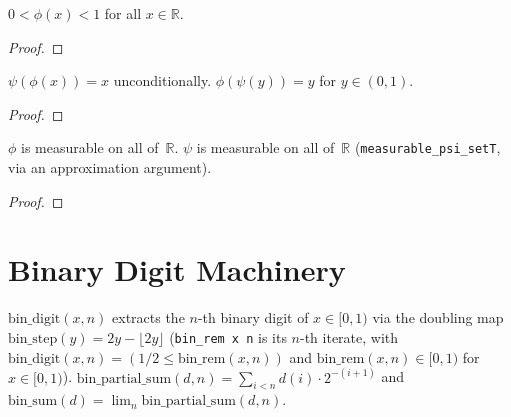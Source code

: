 \begin{lemma}\label{lem:phi_range}
  \rocqok
  $0 < \phi(x) < 1$ for all $x \in \mathbb{R}$.
\end{lemma}
\begin{proof}\rocqok\end{proof}

\begin{lemma}\label{lem:phi_psi_cancel}
  \rocqok
  $\psi(\phi(x)) = x$ unconditionally.
  $\phi(\psi(y)) = y$ for $y \in (0,1)$.
\end{lemma}
\begin{proof}\rocqok\end{proof}

\begin{lemma}\label{lem:phi_psi_measurable}
  \rocqok
  $\phi$ is measurable on all of~$\mathbb{R}$. $\psi$ is measurable on
  all of~$\mathbb{R}$ (\texttt{measurable\_psi\_setT}, via an approximation argument).
\end{lemma}
\begin{proof}\rocqok\end{proof}


\section{Binary Digit Machinery}\label{sec:binary_digits}

\begin{definition}\label{def:bin_digits}
  \rocqok
  $\mathrm{bin\_digit}(x, n)$ extracts the $n$-th binary digit of
  $x \in [0,1)$ via the doubling map
  $\mathrm{bin\_step}(y) = 2y - \lfloor 2y \rfloor$ (\texttt{bin\_rem x n} is its $n$-th iterate, with
  $\mathrm{bin\_digit}(x,n) = (1/2 \le \mathrm{bin\_rem}(x,n))$ and
  $\mathrm{bin\_rem}(x,n) \in [0,1)$ for $x \in [0,1)$).
  $\mathrm{bin\_partial\_sum}(d, n) = \sum_{i<n} d(i) \cdot 2^{-(i+1)}$
  and $\mathrm{bin\_sum}(d) = \lim_n \mathrm{bin\_partial\_sum}(d, n)$.
\end{definition}

